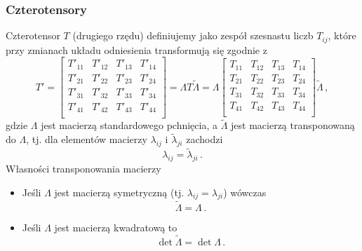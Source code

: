 \documentclass[../main.tex]{subfiles}
\begin{document}
\subsubsection{Czterotensory}
Czterotensor \(T\) (drugiego rzędu) definiujemy jako zespół szesnastu liczb \(T_{ij}\), które przy
zmianach układu odniesienia transformują się zgodnie z
\begin{equation*}
    T'=\left[\begin{array}{cccc}
         T'_{11}&T'_{12}&T'_{13}&T'_{14}  \\
         T'_{21}&T'_{22}&T'_{23}&T'_{24}  \\
         T'_{31}&T'_{32}&T'_{33}&T'_{34}  \\
         T'_{41}&T'_{42}&T'_{43}&T'_{44}  \\
    \end{array}\right]=\Lambda T\tilde{\Lambda}=\Lambda \left[\begin{array}{cccc}
         T_{11}&T_{12}&T_{13}&T_{14}  \\
         T_{21}&T_{22}&T_{23}&T_{24}  \\
         T_{31}&T_{32}&T_{33}&T_{34}  \\
         T_{41}&T_{42}&T_{43}&T_{44}  \\
    \end{array}\right]\tilde{\Lambda}\,,
\end{equation*}
gdzie \(\Lambda\) jest macierzą standardowego pchnięcia, a \(\tilde{\Lambda}\) jest macierzą
transponowaną do \(\Lambda\), tj. dla elementów macierzy \(\lambda_{ij}\) i \(\tilde{\lambda}_{ji}\)
zachodzi
\begin{equation*}
    \lambda_{ij}=\tilde{\lambda}_{ji}\,.
\end{equation*}
Własności transponowania macierzy
\begin{itemize}
    \item Jeśli \(\Lambda\) jest macierzą symetryczną (tj. \(\lambda_{ij}=\lambda_{ji}\)) wówczas
    \begin{equation*}
        \tilde{\Lambda}=\Lambda\,.
    \end{equation*}
    \item Jeśli \(\Lambda\) jest macierzą kwadratową to 
    \begin{equation*}
        \det \tilde{\Lambda}=\det \Lambda\,.
    \end{equation*}
\end{itemize}
\end{document}
